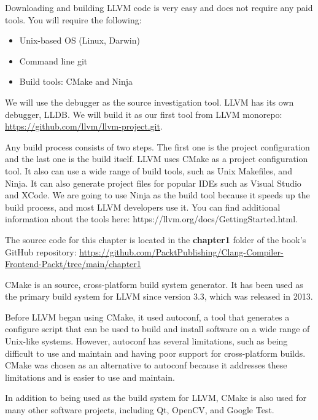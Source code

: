Downloading and building LLVM code is very easy and does not require any paid tools. You will require the following:

\begin{itemize}
\item
Unix-based OS (Linux, Darwin)

\item
Command line git

\item
Build tools: CMake and Ninja
\end{itemize}

We will use the debugger as the source investigation tool. LLVM has its own debugger, LLDB. We will build it as our first tool from LLVM monorepo: \url{https://github.com/llvm/llvm-project.git}.

Any build process consists of two steps. The first one is the project configuration and the last one is the build itself. LLVM uses CMake as a project configuration tool. It also can use a wide range of build tools, such as Unix Makefiles, and Ninja. It can also generate project files for popular IDEs such as Visual Studio and XCode. We are going to use Ninja as the build tool because it speeds up the build process, and most LLVM developers use it. You can find additional information about the tools here: https://llvm.org/docs/GettingStarted.html.

The source code for this chapter is located in the \textbf{chapter1} folder of the book's GitHub repository: \url{https://github.com/PacktPublishing/Clang-Compiler-Frontend-Packt/tree/main/chapter1}



CMake is an source, cross-platform build system generator. It has been used as the primary build system for LLVM since version 3.3, which was released in 2013.

Before LLVM began using CMake, it used autoconf, a tool that generates a configure script that can be used to build and install software on a wide range of Unix-like systems. However, autoconf has several limitations, such as being difficult to use and maintain and having poor support for cross-platform builds. CMake was chosen as an alternative to autoconf because it addresses these limitations and is easier to use and maintain.

In addition to being used as the build system for LLVM, CMake is also used for many other software projects, including Qt, OpenCV, and Google Test.



